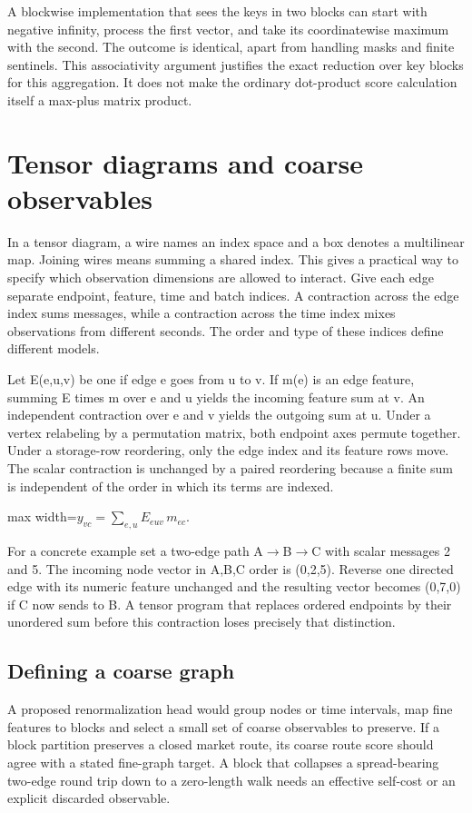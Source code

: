 \documentclass[11pt,oneside,openany]{book}
\begin{document}
A blockwise implementation that sees the keys in two blocks can start with negative infinity, process the first vector, and take its coordinatewise maximum with the second. The outcome is identical, apart from handling masks and finite sentinels. This associativity argument justifies the exact reduction over key blocks for this aggregation. It does not make the ordinary dot-product score calculation itself a max-plus matrix product.

\chapter{Tensor diagrams and coarse observables}
In a tensor diagram, a wire names an index space and a box denotes a multilinear map. Joining wires means summing a shared index. This gives a practical way to specify which observation dimensions are allowed to interact. Give each edge separate endpoint, feature, time and batch indices. A contraction across the edge index sums messages, while a contraction across the time index mixes observations from different seconds. The order and type of these indices define different models.

Let E(e,u,v) be one if edge e goes from u to v. If m(e) is an edge feature, summing E times m over e and u yields the incoming feature sum at v. An independent contraction over e and v yields the outgoing sum at u. Under a vertex relabeling by a permutation matrix, both endpoint axes permute together. Under a storage-row reordering, only the edge index and its feature rows move. The scalar contraction is unchanged by a paired reordering because a finite sum is independent of the order in which its terms are indexed.

\begin{center}\begin{adjustbox}{max width=\linewidth}$\displaystyle y_{vc}=\sum_{e,u}E_{euv}\,m_{ec}.$\end{adjustbox}\end{center}
For a concrete example set a two-edge path A\ensuremath{\to}B\ensuremath{\to}C with scalar messages 2 and 5. The incoming node vector in A,B,C order is (0,2,5). Reverse one directed edge with its numeric feature unchanged and the resulting vector becomes (0,7,0) if C now sends to B. A tensor program that replaces ordered endpoints by their unordered sum before this contraction loses precisely that distinction.

\section*{Defining a coarse graph}
A proposed renormalization head would group nodes or time intervals, map fine features to blocks and select a small set of coarse observables to preserve. If a block partition preserves a closed market route, its coarse route score should agree with a stated fine-graph target. A block that collapses a spread-bearing two-edge round trip down to a zero-length walk needs an effective self-cost or an explicit discarded observable.
\end{document}
